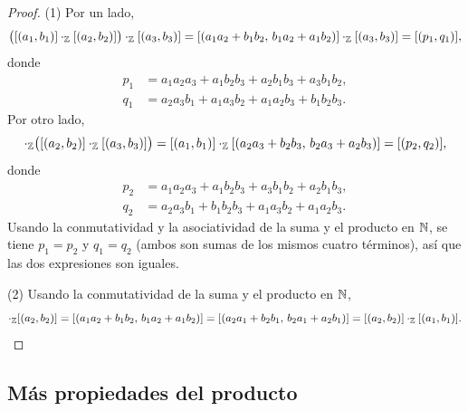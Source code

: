 \documentclass[12pt,a4paper]{book}
\begin{document}
    \begin{proof}
        (1) Por un lado,
        \begin{equation*}
            \big([(a_{1},b_{1})]\cdot_{\mathbb{Z}}[(a_{2},b_{2})]\big)\cdot_{\mathbb{Z}}[(a_{3},b_{3})] = [(a_{1}a_{2}+b_{1}b_{2},\,b_{1}a_{2}+a_{1}b_{2})]\cdot_{\mathbb{Z}}[(a_{3},b_{3})] = [(p_{1},q_{1})],
        \end{equation*}
        donde
        \begin{align*}
            p_{1} &= a_{1}a_{2}a_{3}+a_{1}b_{2}b_{3}+a_{2}b_{1}b_{3}+a_{3}b_{1}b_{2},\\
            q_{1} &= a_{2}a_{3}b_{1}+a_{1}a_{3}b_{2}+a_{1}a_{2}b_{3}+b_{1}b_{2}b_{3}.
        \end{align*}
        Por otro lado,
        \begin{equation*}
            [(a_{1},b_{1})]\cdot_{\Z}\big([(a_{2},b_{2})]\cdot_{\Z}[(a_{3},b_{3})]\big) = [(a_{1},b_{1})]\cdot_{\Z}[(a_{2}a_{3}+b_{2}b_{3},\,b_{2}a_{3}+a_{2}b_{3})] = [(p_{2},q_{2})],
        \end{equation*}
        donde
        \begin{align*}
            p_{2} &= a_{1}a_{2}a_{3}+a_{1}b_{2}b_{3}+a_{3}b_{1}b_{2}+a_{2}b_{1}b_{3},\\
            q_{2} &= a_{2}a_{3}b_{1}+b_{1}b_{2}b_{3}+a_{1}a_{3}b_{2}+a_{1}a_{2}b_{3}.
        \end{align*}
        Usando la conmutatividad y la asociatividad de la suma y el producto en $\mathbb{N}$, se tiene $p_{1}=p_{2}$ y $q_{1}=q_{2}$ (ambos son sumas de los mismos cuatro términos), así que las dos expresiones son iguales.

        (2) Usando la conmutatividad de la suma y el producto en $\mathbb{N}$,
        \begin{equation*}
            [(a_{1},b_{1})]\cdot_{\Z}[(a_{2},b_{2})] = [(a_{1}a_{2}+b_{1}b_{2},\,b_{1}a_{2}+a_{1}b_{2})] = [(a_{2}a_{1}+b_{2}b_{1},\,b_{2}a_{1}+a_{2}b_{1})] = [(a_{2},b_{2})]\cdot_{\Z}[(a_{1},b_{1})].
        \end{equation*}
    \end{proof}

    \subsection{Más propiedades del producto}
\end{document}
